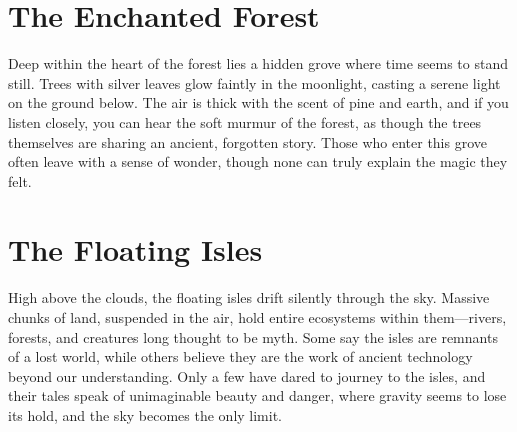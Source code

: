 \documentclass[12pt]{article}
\begin{document}
\thispagestyle{fancy}
\pagestyle{fancy}

\section{The Enchanted Forest}
Deep within the heart of the forest lies a hidden grove where time seems to stand still. Trees with silver leaves glow faintly in the moonlight, casting a serene light on the ground below. The air is thick with the scent of pine and earth, and if you listen closely, you can hear the soft murmur of the forest, as though the trees themselves are sharing an ancient, forgotten story. Those who enter this grove often leave with a sense of wonder, though none can truly explain the magic they felt.

\section{The Floating Isles}
High above the clouds, the floating isles drift silently through the sky. Massive chunks of land, suspended in the air, hold entire ecosystems within them—rivers, forests, and creatures long thought to be myth. Some say the isles are remnants of a lost world, while others believe they are the work of ancient technology beyond our understanding. Only a few have dared to journey to the isles, and their tales speak of unimaginable beauty and danger, where gravity seems to lose its hold, and the sky becomes the only limit.
\end{document}
